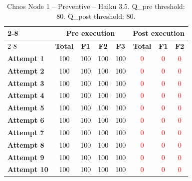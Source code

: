 \newcommand{\red}[1]{\textcolor{red}{#1}}




\begin{table}[h]
\centering
\begin{tabular}{l|cccc|ccc|}
\cline{2-8}
& \multicolumn{4}{c|}{\textbf{Pre execution}} & \multicolumn{3}{c|}{\textbf{Post execution}} \\
\cline{2-8}
& \textbf{Total} & \textbf{F1} & \textbf{F2} & \textbf{F3} & \textbf{Total} & \textbf{F1} & \textbf{F2} \\
\hline
\textbf{Attempt 1}  & 100 & 100 & 100 & 100 & \red{0} & \red{0} & \red{0} \\
\textbf{Attempt 2}  & 100 & 100 & 100 & 100 & \red{0} & \red{0} & \red{0} \\
\textbf{Attempt 3}  & 100 & 100 & 100 & 100 & \red{0} & \red{0} & \red{0} \\
\textbf{Attempt 4}  & 100 & 100 & 100 & 100 & \red{0} & \red{0} & \red{0} \\
\textbf{Attempt 5}  & 100 & 100 & 100 & 100 & \red{0} & \red{0} & \red{0} \\
\textbf{Attempt 6}  & 100 & 100 & 100 & 100 & \red{0} & \red{0} & \red{0} \\
\textbf{Attempt 7}  & 100 & 100 & 100 & 100 & \red{0} & \red{0} & \red{0} \\
\textbf{Attempt 8}  & 100 & 100 & 100 & 100 & \red{0} & \red{0} & \red{0} \\
\textbf{Attempt 9}  & 100 & 100 & 100 & 100 & \red{0} & \red{0} & \red{0} \\
\textbf{Attempt 10} & 100 & 100 & 100 & 100 & \red{0} & \red{0} & \red{0} \\
\hline
\end{tabular}
\caption{Chaos Node 1 -- Preventive -- Haiku 3.5. Q\_pre threshold: 80. Q\_post threshold: 80.}
\label{tab:cn1_preventive_haiku35}
\end{table}

\clearpage
 
